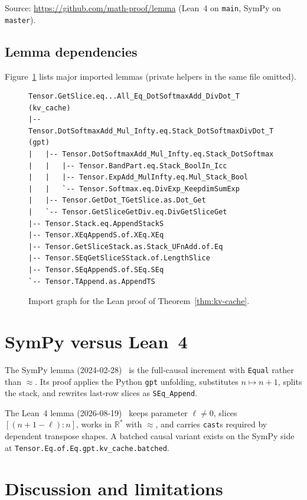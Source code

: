 \documentclass[11pt,a4paper]{article}
\newcommand{\XEq}{\approx}
\newcommand{\Rstar}{\mathbb{R}^*}
\begin{document}
Source: \url{https://github.com/math-proof/lemma} (Lean~4 on \texttt{main}, SymPy on \texttt{master}).

\subsection{Lemma dependencies}
\label{sec:deps}

Figure~\ref{fig:deps} lists major imported lemmas (private helpers in the same file omitted).

\begin{figure}[ht]
\small
\begin{verbatim}
Tensor.GetSlice.eq...All_Eq_DotSoftmaxAdd_DivDot_T  (kv_cache)
|-- Tensor.DotSoftmaxAdd_Mul_Infty.eq.Stack_DotSoftmaxDivDot_T  (gpt)
|   |-- Tensor.DotSoftmaxAdd_Mul_Infty.eq.Stack_DotSoftmax
|   |   |-- Tensor.BandPart.eq.Stack_BoolIn_Icc
|   |   |-- Tensor.ExpAdd_MulInfty.eq.Mul_Stack_Bool
|   |   `-- Tensor.Softmax.eq.DivExp_KeepdimSumExp
|   |-- Tensor.GetDot_TGetSlice.as.Dot_Get
|   `-- Tensor.GetSliceGetDiv.eq.DivGetSliceGet
|-- Tensor.Stack.eq.AppendStackS
|-- Tensor.XEqAppendS.of.XEq.XEq
|-- Tensor.GetSliceStack.as.Stack_UFnAdd.of.Eq
|-- Tensor.SEqGetSliceSStack.of.LengthSlice
|-- Tensor.SEqAppendS.of.SEq.SEq
`-- Tensor.TAppend.as.AppendTS
\end{verbatim}
\caption{Import graph for the Lean proof of Theorem~\ref{thm:kv-cache}.}
\label{fig:deps}
\end{figure}

\section{SymPy versus Lean~4}
\label{sec:sympy-lean}

The SymPy lemma (2024-02-28)~\cite{lemma_kv_cache_sympy} is the full-causal increment with \texttt{Equal} rather than $\XEq$.
Its proof applies the Python \texttt{gpt} unfolding, substitutes $n\mapsto n+1$, splits the stack, and rewrites last-row slices as \texttt{SEq\_Append}.

The Lean~4 lemma (2026-08-19)~\cite{lemma_kv_cache_lean} keeps parameter $\ell\neq 0$, slices $[(n+1-\ell):n]$, works in $\Rstar$ with $\XEq$, and carries \texttt{cast}s required by dependent transpose shapes.
A batched causal variant exists on the SymPy side at \texttt{Tensor.Eq.of.Eq.gpt.kv\_cache.batched}.

\section{Discussion and limitations}
\label{sec:discussion}
\end{document}
